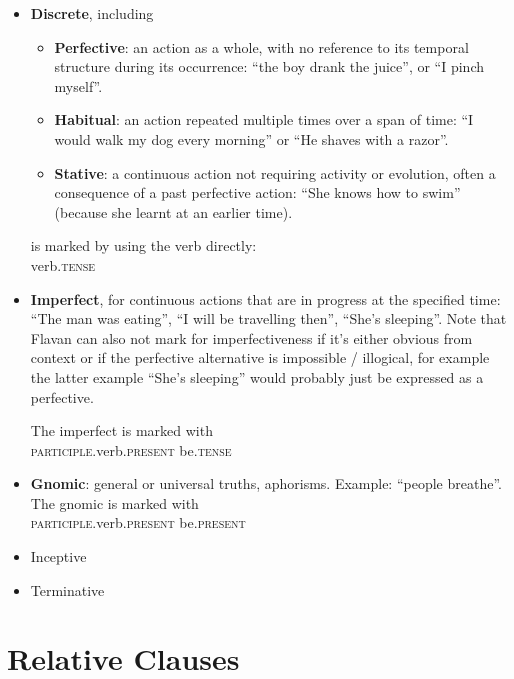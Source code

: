 \documentclass[10pt,oneside]{memoir}
\begin{document}
\begin{multicols}{2}
    \begin{itemize}
        \item \textbf{Discrete}, including 
            \begin{itemize}
                \item \textbf{Perfective}: an action as a whole, with no reference to its temporal structure during its occurrence: ``the boy drank the juice'', or ``I pinch myself''.
                \item \textbf{Habitual}: an action repeated multiple times over a span of time: ``I would walk my dog every morning'' or ``He shaves with a razor''.
                \item \textbf{Stative}: a continuous action not requiring activity or evolution, often a consequence of a past perfective action: ``She knows how to swim'' (because she learnt at an earlier time).
            \end{itemize}
            is marked by using the verb directly:\\
            verb\textsc{.tense}
        \item \textbf{Imperfect}, for continuous actions that are in progress at the specified time: ``The man was eating'', ``I will be travelling then'', ``She's sleeping''. Note that Flavan can also not mark for imperfectiveness if it's either obvious from context or if the perfective alternative is impossible / illogical, for example the latter example ``She's sleeping'' would probably just be expressed as a perfective.
            
            The imperfect is marked with\\
            \textsc{participle}.verb\textsc{.present} be\textsc{.tense}
        \item \textbf{Gnomic}: general or universal truths, aphorisms. Example: ``people breathe''. The gnomic is marked with\\
            \textsc{participle}.verb\textsc{.present} be\textsc{.present}
        \item Inceptive
        \item Terminative
    \end{itemize}

\end{multicols}


\pagebreak



\section{Relative Clauses}\label{relative}
\end{document}
